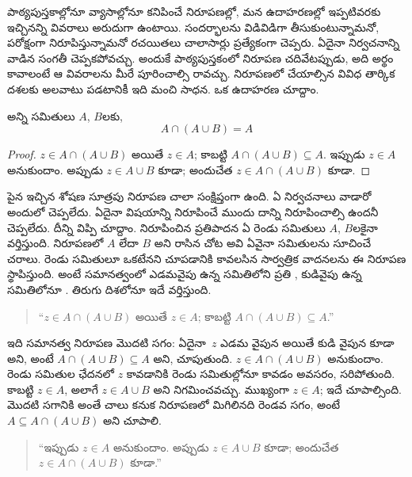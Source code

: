 \documentclass[../../../include/open-logic-section]{subfiles}
\begin{document}

పాఠ్యపుస్తకాల్లోనూ వ్యాసాల్లోనూ కనిపించే నిరూపణల్లో,
మన ఉదాహరణల్లో ఇప్పటివరకు ఇచ్చినన్ని వివరాలు అరుదుగా ఉంటాయి.
సందర్భాలను విడివిడిగా తీసుకుంటున్నామనో, పరోక్షంగా
నిరూపిస్తున్నామనో రచయితలు చాలాసార్లు ప్రత్యేకంగా చెప్పరు.
ఏదైనా నిర్వచనాన్ని వాడిన సంగతీ చెప్పకపోవచ్చు. అందుకే
పాఠ్యపుస్తకంలో నిరూపణ చదివేటప్పుడు, అది అర్థం కావాలంటే
ఆ వివరాలను మీరే పూరించాల్సి రావచ్చు. నిరూపణలో చేయాల్సిన
వివిధ తార్కిక దశలకు అలవాటు పడటానికీ ఇది మంచి సాధన.
ఒక ఉదాహరణ చూద్దాం.

\begin{prop}[శోషణ]
అన్ని సమితులు $A$, $B$లకు,
\[
A \cap (A \cup B) = A
\]
\end{prop}

\begin{proof}
$z \in A \cap (A \cup B)$ అయితే $z \in A$; కాబట్టి $A \cap (A \cup B)
\subseteq A$. ఇప్పుడు $z \in A$ అనుకుందాం. అప్పుడు $z \in A \cup B$ కూడా; అందుచేత $z \in A \cap (A \cup B)$ కూడా.
\end{proof}

పైన ఇచ్చిన శోషణ సూత్రపు నిరూపణ చాలా సంక్షిప్తంగా ఉంది. ఏ నిర్వచనాలు వాడారో అందులో చెప్పలేదు. ఏదైనా విషయాన్ని నిరూపించే ముందు దాన్ని నిరూపించాల్సి ఉందనీ చెప్పలేదు. దీన్ని విప్పి చూద్దాం. నిరూపించిన ప్రతిపాదన ఏ రెండు సమితులు $A$, $B$లకైనా వర్తిస్తుంది. నిరూపణలో $A$ లేదా $B$ అని రాసిన చోట అవి ఏవైనా సమితులను సూచించే చరాలు. రెండు సమితులూ ఒకటేనని చూపడానికి కావలసిన సార్వత్రిక వాదనలను ఈ నిరూపణ స్థాపిస్తుంది. అంటే సమానత్వంలో ఎడమవైపు ఉన్న సమితిలోని ప్రతి , కుడివైపు ఉన్న సమితిలోనూ .
తిరుగు దిశలోనూ ఇదే వర్తిస్తుంది.

\begin{quote}
``$z \in A \cap (A \cup B)$ అయితే $z \in A$; కాబట్టి $A \cap (A \cup B)
  \subseteq A$.''
\end{quote}

ఇది సమానత్వ నిరూపణ మొదటి సగం: ఏదైనా~$z$ ఎడమ వైపున  అయితే కుడి వైపున కూడా  అని, అంటే $A \cap (A \cup B) \subseteq A$ అని, చూపుతుంది. $z \in A \cap (A \cup B)$ అనుకుందాం. రెండు సమితుల ఛేదనలో $z$  కావడానికి రెండు సమితుల్లోనూ  కావడం అవసరం, సరిపోతుంది. కాబట్టి $z \in A$, అలాగే $z \in A \cup B$ అని నిగమించవచ్చు. ముఖ్యంగా $z \in A$; ఇదే చూపాల్సింది. మొదటి సగానికి అంతే చాలు కనుక నిరూపణలో మిగిలినది రెండవ సగం, అంటే $A \subseteq A \cap
(A \cup B)$ అని చూపాలి.

\begin{quote}
``ఇప్పుడు $z \in A$ అనుకుందాం. అప్పుడు $z \in A \cup B$ కూడా; అందుచేత $z \in A \cap (A \cup B)$ కూడా.''
\end{quote}
\end{document}

